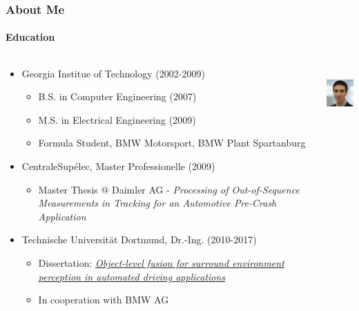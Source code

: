 \begin{frame}[t]
\frametitle{About Me}
\framesubtitle{Education}
\begin{columns}[T]
    \begin{column}{.80\textwidth}
    \begin{itemize}
        \item Georgia Institue of Technology (2002-2009)
        \begin{itemize}
            \item B.S. in Computer Engineering (2007)
            \item M.S. in Electrical Engineering (2009)
            \item Formula Student, BMW Motorsport, BMW Plant Spartanburg
        \end{itemize}
        \item CentraleSup\'{e}lec, Master Professionelle (2009)
        \begin{itemize}
            \item Master Thesis @ Daimler AG - \emph{Processing of Out-of-Sequence
                Measurements in Tracking for an Automotive Pre-Crash Application}
        \end{itemize}
        \item Technische Universit\"{a}t Dortmund, Dr.-Ing. (2010-2017)
        \begin{itemize}
            \item Dissertation: \emph{\href{https://eldorado.tu-dortmund.de/handle/2003/36011}{Object-level fusion for surround environment perception in automated driving applications}}
            \item In cooperation with BMW AG
        \end{itemize}
    \end{itemize}
    \end{column}
    \begin{column}{.20\textwidth}
    \centering
    \includegraphics[height=2.0cm]{images/michael-aeberhard-profile.jpg} \\
    \end{column}
\end{columns}
\end{frame}

